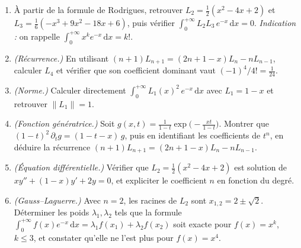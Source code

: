 \begin{mdframed}[style=exobar]
  \begin{enumerate}
    \item À partir de la formule de Rodrigues, retrouver
          $L_2=\tfrac{1}{2}(x^2-4x+2)$ et
          $L_3=\tfrac{1}{6}(-x^3+9x^2-18x+6)$, puis vérifier
          $\int_0^{+\infty} L_2 L_3\,e^{-x}\,\mathrm{d}x=0$.
          \textit{Indication :} on rappelle
          $\int_0^{+\infty} x^k e^{-x}\,\mathrm{d}x=k!$.

    \item \textit{(Récurrence.)} En utilisant
          $(n+1)L_{n+1}=(2n+1-x)L_n-nL_{n-1}$, calculer $L_4$ et vérifier
          que son coefficient dominant vaut ${(-1)}^4/4!=\tfrac{1}{24}$.

    \item \textit{(Norme.)} Calculer directement
          $\int_0^{+\infty} {L_1(x)}^2\,e^{-x}\,\mathrm{d}x$ avec $L_1=1-x$ et
          retrouver $\|L_1\|=1$.

    \item \textit{(Fonction génératrice.)}
          Soit $g(x,t)=\frac{1}{1-t}\exp\!\bigl(-\frac{xt}{1-t}\bigr)$. Montrer
          que $(1-t)^2\,\partial_t g=(1-t-x)\,g$, puis en identifiant les
          coefficients de $t^n$, en déduire la récurrence
          $(n+1)L_{n+1}=(2n+1-x)L_n-nL_{n-1}$.

    \item \textit{(Équation différentielle.)} Vérifier que
          $L_2=\tfrac{1}{2}(x^2-4x+2)$ est solution de
          $xy''+(1-x)y'+2y=0$, et expliciter le coefficient $n$ en fonction du
          degré.

    \item \textit{(Gauss--Laguerre.)} Avec $n=2$, les racines de $L_2$ sont
          $x_{1,2}=2\pm\sqrt{2}$. Déterminer les poids $\lambda_1,\lambda_2$
          tels que la formule
          $\int_0^{+\infty} f(x)e^{-x}\,\mathrm{d}x=\lambda_1 f(x_1)+\lambda_2 f(x_2)$
          soit exacte pour $f(x)=x^k$, $k\leq 3$, et constater qu'elle ne
          l'est plus pour $f(x)=x^4$.
  \end{enumerate}
\end{mdframed}


